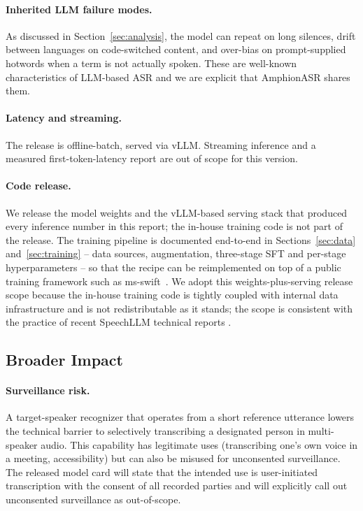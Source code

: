 \paragraph{Inherited LLM failure modes.}
As discussed in Section~\ref{sec:analysis}, the model can repeat on
long silences, drift between languages on code-switched content, and
over-bias on prompt-supplied hotwords when a term is not actually
spoken. These are well-known characteristics of LLM-based ASR and we
are explicit that AmphionASR shares them.

\paragraph{Latency and streaming.}
The release is offline-batch, served via vLLM. Streaming inference
and a measured first-token-latency report are out of scope for this
version.

\paragraph{Code release.}
We release the model weights and the vLLM-based serving stack that
produced every inference number in this report; the in-house
training code is not part of the release. The training pipeline is
documented end-to-end in Sections~\ref{sec:data}
and~\ref{sec:training} -- data sources, augmentation, three-stage
SFT and per-stage hyperparameters -- so that the recipe can be
reimplemented on top of a public training framework such as
ms-swift~\cite{msswift}. We adopt this weights-plus-serving release
scope because the in-house training code is tightly coupled with
internal data infrastructure and is not redistributable as it
stands; the scope is consistent with the practice of recent
SpeechLLM technical reports
\cite{radford2023whisper, kimiaudio2025, stepaudio22025,
qwen2025qwen3asr}.

\subsection{Broader Impact}

\paragraph{Surveillance risk.}
A target-speaker recognizer that operates from a short reference
utterance lowers the technical barrier to selectively transcribing a
designated person in multi-speaker audio. This capability has
legitimate uses (transcribing one's own voice in a meeting,
accessibility) but can also be misused for unconsented surveillance.
The released model card will state that the intended use is
user-initiated transcription with the consent of all recorded parties
and will explicitly call out unconsented surveillance as out-of-scope.

